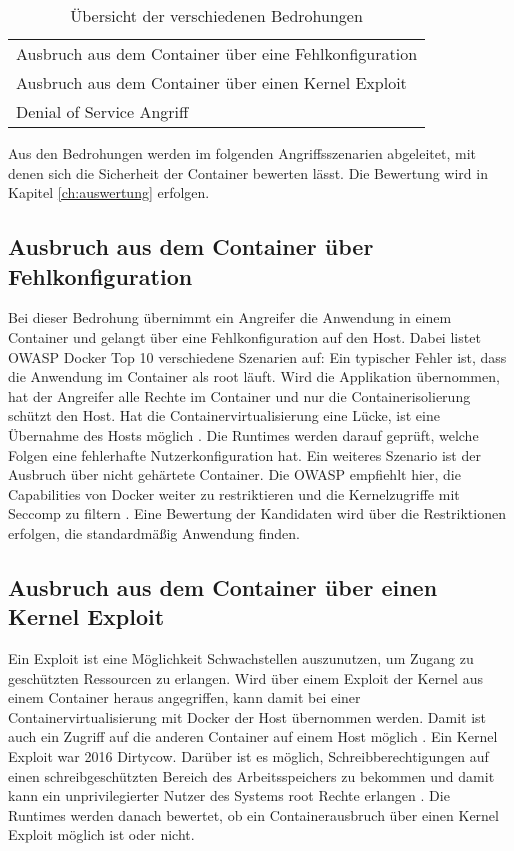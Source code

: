 \begin{table}[hbt]
	\small
	\myfloatalign
	\begin{tabularx}{\textwidth}{X} \hline
		\spacedlowsmallcaps{Bedrohungen} \\ \hline
		Ausbruch aus dem Container über eine Fehlkonfiguration \\
		Ausbruch aus dem Container über einen  Kernel Exploit\\
		Denial of Service Angriff                               \\
		\hline
	\end{tabularx}
	\caption[Übersicht der verschiedenen Bedrohungen]{Übersicht der verschiedenen Bedrohungen}
	\label{tbl:bedrohungen}
\end{table}

Aus den Bedrohungen werden im folgenden Angriffsszenarien abgeleitet, mit denen sich  die Sicherheit der Container bewerten lässt. Die Bewertung wird in Kapitel \ref{ch:auswertung} erfolgen.

\subsection{Ausbruch aus dem Container über Fehlkonfiguration}
Bei dieser Bedrohung übernimmt ein Angreifer die Anwendung in einem Container und gelangt über eine Fehlkonfiguration auf den Host. Dabei listet \ac{OWASP} Docker Top 10 verschiedene Szenarien auf: Ein typischer Fehler ist, dass die Anwendung im Container als root läuft. Wird die Applikation übernommen, hat der Angreifer alle Rechte im Container und nur die Containerisolierung schützt den Host. Hat die Containervirtualisierung eine Lücke, ist eine Übernahme des Hosts möglich \cite[vgl.][7]{OWASP.2019}. Die Runtimes werden darauf geprüft, welche Folgen eine fehlerhafte Nutzerkonfiguration hat. 
Ein weiteres Szenario ist der Ausbruch über nicht gehärtete Container. Die \ac{OWASP} empfiehlt hier, die Capabilities von Docker weiter zu restriktieren und die Kernelzugriffe mit Seccomp zu filtern \cite[vgl.][13]{OWASP.2019}. Eine Bewertung der Kandidaten wird über die Restriktionen erfolgen, die standardmäßig Anwendung finden. 

\subsection{Ausbruch aus dem Container über einen Kernel Exploit}
Ein Exploit ist eine Möglichkeit Schwachstellen auszunutzen, um Zugang zu geschützten Ressourcen zu erlangen. Wird über einem Exploit der Kernel aus einem Container heraus angegriffen, kann damit bei einer Containervirtualisierung mit Docker der Host übernommen werden. Damit ist auch ein Zugriff auf die anderen Container auf einem Host möglich \cite[vgl.][4, 9, 10, 15]{OWASP.2019}. Ein Kernel Exploit war 2016 Dirtycow. Darüber ist es möglich, Schreibberechtigungen auf einen schreibgeschützten Bereich des Arbeitsspeichers zu bekommen und damit kann ein unprivilegierter Nutzer des Systems root Rechte erlangen \cite[vgl.][]{Saleel.2017}. Die Runtimes werden danach bewertet, ob ein Containerausbruch über einen Kernel Exploit möglich ist oder nicht.


